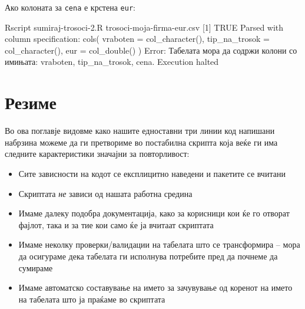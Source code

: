 \documentclass[
]{book}
\newenvironment{Shaded}{\begin{snugshade}}{\end{snugshade}}
\newcommand{\ExtensionTok}[1]{#1}
\newcommand{\NormalTok}[1]{#1}
\newcommand{\StringTok}[1]{\textcolor[rgb]{0.31,0.60,0.02}{#1}}
\providecommand{\tightlist}{%
  \setlength{\itemsep}{0pt}\setlength{\parskip}{0pt}}
\begin{document}
Ако колоната за \texttt{cena} е крстена \texttt{eur}:

\begin{Shaded}
\begin{Highlighting}[]
\ExtensionTok{Rscript}\NormalTok{ sumiraj{-}trosoci{-}2.R trosoci{-}moja{-}firma{-}eur.csv}
\NormalTok{[}\ExtensionTok{1}\NormalTok{] TRUE}
\ExtensionTok{Parsed}\NormalTok{ with column specification:}
\ExtensionTok{cols}\NormalTok{(}
  \ExtensionTok{vraboten}\NormalTok{ = col\_character(),}
  \ExtensionTok{tip\_na\_trosok}\NormalTok{ = col\_character(),}
  \ExtensionTok{eur}\NormalTok{ = col\_double()}
\NormalTok{)}
\ExtensionTok{Error}\NormalTok{: Табелата мора да содржи колони со имињата: }\StringTok{\textquotesingle{}vraboten\textquotesingle{}}\NormalTok{, }\StringTok{\textquotesingle{}tip\_na\_trosok\textquotesingle{}}\NormalTok{, }\StringTok{\textquotesingle{}cena\textquotesingle{}}\NormalTok{.}
\ExtensionTok{Execution}\NormalTok{ halted}
\end{Highlighting}
\end{Shaded}

\hypertarget{ux440ux435ux437ux438ux43cux435-1}{%
\section{Резиме}\label{ux440ux435ux437ux438ux43cux435-1}}

Во ова поглавје видовме како нашите едноставни три линии код напишани набрзина можеме да ги претвориме во постабилна скрипта која веќе ги има следните карактеристики значајни за повторливост:

\begin{itemize}
\tightlist
\item
  Сите зависности на кодот се експлицитно наведени и пакетите се вчитани\\
\item
  Скриптата \emph{не} зависи од нашата работна средина\\
\item
  Имаме далеку подобра документација, како за корисници кои ќе го отворат фајлот, така и за тие кои само ќе ја вчитаат скриптата\\
\item
  Имаме неколку проверки/валидации на табелата што се трансформира -- мора да осигураме дека табелата ги исполнува потребите пред да почнеме да сумираме\\
\item
  Имаме автоматско составување на името за зачувување од коренот на името на табелата што ја праќаме во скриптата
\end{itemize}
\end{document}
